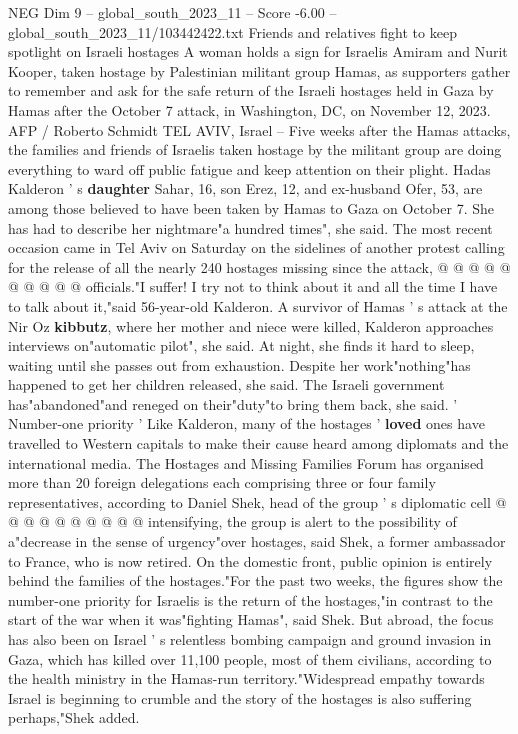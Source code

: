 \begin{textsample}{NEG Dim 9 – global\_south\_2023\_11 – Score -6.00 – global\_south\_2023\_11/103442422.txt}  \label{ex:f9_neg_312}
Friends and relatives fight to keep spotlight on Israeli hostages A woman holds a sign for Israelis Amiram and Nurit Kooper, taken hostage by Palestinian militant group Hamas, as supporters gather to remember and ask for the safe return of the Israeli hostages held in Gaza by Hamas after the October 7 attack, in Washington, DC, on November 12, 2023.
AFP / Roberto Schmidt TEL AVIV, Israel -- Five weeks after the Hamas attacks, the families and friends of Israelis taken hostage by the militant group are doing everything to ward off public fatigue and keep attention on their plight.
Hadas Kalderon ' s \textbf{daughter} Sahar, 16, son Erez, 12, and ex-husband Ofer, 53, are among those believed to have been taken by Hamas to Gaza on October 7.
She has had to describe her nightmare"a hundred times", she said.
The most recent occasion came in Tel Aviv on Saturday on the sidelines of another protest calling for the release of all the nearly 240 hostages missing since the attack, @ @ @ @ @ @ @ @ @ @ officials."I suffer!
I try not to think about it and all the time I have to talk about it,"said 56-year-old Kalderon.
A survivor of Hamas ' s attack at the Nir Oz \textbf{kibbutz}, where her mother and niece were killed, Kalderon approaches interviews on"automatic pilot", she said.
At night, she finds it hard to sleep, waiting until she passes out from exhaustion.
Despite her work"nothing"has happened to get her children released, she said.
The Israeli government has"abandoned"and reneged on their"duty"to bring them back, she said. ' Number-one priority ' Like Kalderon, many of the hostages ' \textbf{loved} ones have travelled to Western capitals to make their cause heard among diplomats and the international media.
The Hostages and Missing Families Forum has organised more than 20 foreign delegations each comprising three or four family representatives, according to Daniel Shek, head of the group ' s diplomatic cell @ @ @ @ @ @ @ @ @ @ intensifying, the group is alert to the possibility of a"decrease in the sense of urgency"over hostages, said Shek, a former ambassador to France, who is now retired.
On the domestic front, public opinion is entirely behind the families of the hostages."For the past two weeks, the figures show the number-one priority for Israelis is the return of the hostages,"in contrast to the start of the war when it was"fighting Hamas", said Shek.
But abroad, the focus has also been on Israel ' s relentless bombing campaign and ground invasion in Gaza, which has killed over 11,100 people, most of them civilians, according to the health ministry in the Hamas-run territory."Widespread empathy towards Israel is beginning to crumble and the story of the hostages is also suffering perhaps,"Shek added.

\end{textsample}
